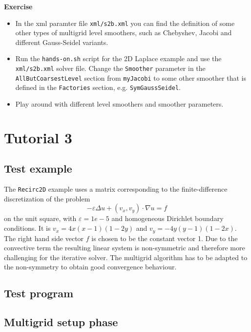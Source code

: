 \documentclass[12pt,a4paper]{article}
\begin{document}
\begin{graybox}
 \textbf{Exercise}
 \begin{itemize}
  \item In the xml paramter file \verb|xml/s2b.xml| you can find the definition of some other types of multigrid level smoothers, such as Chebyshev, Jacobi and different Gauss-Seidel variants.
  \item Run the \verb|hands-on.sh| script for the 2D Laplace example and use the \verb|xml/s2b.xml| solver file. Change the \verb|Smoother| parameter in the \verb|AllButCoarsestLevel| section from \verb|myJacobi| to some other smoother that is defined in the \verb|Factories| section, e.g. \verb|SymGaussSeidel|.
  \item Play around with different level smoothers and smoother parameters.
 \end{itemize}
\end{graybox}


\section{Tutorial 3}

\subsection{Test example}
The \texttt{Recirc2D} example uses a matrix corresponding to the finite-difference discretization of the problem
\begin{displaymath}
-\varepsilon\Delta u + (v_x,v_y)\cdot \nabla u=f
\end{displaymath}
on the unit square, with $\varepsilon=1e-5$ and homogeneous Dirichlet boundary conditions. It is $v_x=4x(x-1)(1-2y)$ and $v_y=-4y(y-1)(1-2x)$.
The right hand side vector $f$ is chosen to be the constant vector 1. Due to the convective term the resulting linear system is non-symmetric and therefore more challenging for the iterative solver. The multigrid algorithm has to be adapted to the non-symmetry to obtain good convergence behaviour.

\subsection{Test program}

\subsection{Multigrid setup phase}
\end{document}
